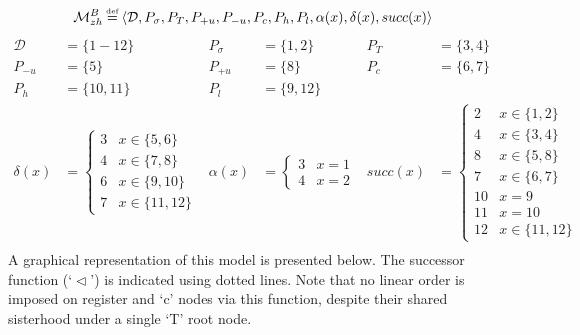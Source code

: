 \documentclass{article}
\newcommand\myeq{\mathrel{\stackrel{\makebox[0pt]{\mbox{\normalfont\tiny def}}}{=}}}
\begin{document}
\begin{equation}
\begin{aligned}
\mathcal{M}^{B}_{zh}&\myeq\langle \mathcal{D},P_{\sigma},P_{T},P_{+u},P_{-u},P_{c},P_{h},P_{l},\alpha(x),\delta(x),succ(x)\rangle
\end{aligned}
\end{equation}
\begin{equation}
\begin{aligned}
\mathcal{D}&=\{1-12\} & P_{\sigma}&=\{1,2\} & P_{T}&=\{3,4\} \\
P_{-u}&=\{5\} & P_{+u}&=\{8\} & P_{c}&=\{6,7\} \\
P_{h}&=\{10,11\} & P_{l}&=\{9,12\} & \\
\delta(x)&=\begin{cases} 3 & x\in\{5,6\} \\ 4 & x\in\{7,8\} \\ 6 & x\in\{9,10\} \\ 7 & x\in\{11,12\}\end{cases} & \alpha(x)&=\begin{cases} 3 & x=1 \\ 4 & x=2\end{cases} & succ(x)&=\begin{cases} 2 & x\in\{1,2\} \\ 4 & x\in\{3,4\} \\ 8 & x\in\{5,8\} \\ 7 & x\in\{6,7\} \\ 10 & x=9 \\ 11 & x=10 \\ 12 & x\in\{11,12\}\end{cases}\\
\end{aligned}
\end{equation}
A graphical representation of this model is presented below. The successor function (`$\vartriangleleft$') is indicated using dotted lines. Note that no linear order is imposed on register and `c' nodes via this function, despite their shared sisterhood under a single `T' root node.
\end{document}
